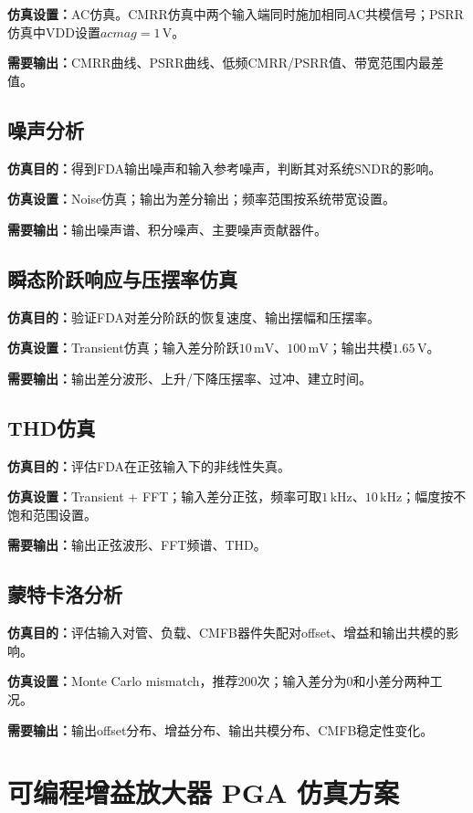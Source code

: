 \documentclass[12pt,a4paper]{ctexart}
\begin{document}
\textbf{仿真设置：}AC仿真。CMRR仿真中两个输入端同时施加相同AC共模信号；PSRR仿真中VDD设置$acmag=1\,\mathrm{V}$。

\textbf{需要输出：}CMRR曲线、PSRR曲线、低频CMRR/PSRR值、带宽范围内最差值。

\subsection{噪声分析}

\textbf{仿真目的：}得到FDA输出噪声和输入参考噪声，判断其对系统SNDR的影响。

\textbf{仿真设置：}Noise仿真；输出为差分输出；频率范围按系统带宽设置。

\textbf{需要输出：}输出噪声谱、积分噪声、主要噪声贡献器件。

\subsection{瞬态阶跃响应与压摆率仿真}

\textbf{仿真目的：}验证FDA对差分阶跃的恢复速度、输出摆幅和压摆率。

\textbf{仿真设置：}Transient仿真；输入差分阶跃$10\,\mathrm{mV}$、$100\,\mathrm{mV}$；输出共模$1.65\,\mathrm{V}$。

\textbf{需要输出：}输出差分波形、上升/下降压摆率、过冲、建立时间。

\subsection{THD仿真}

\textbf{仿真目的：}评估FDA在正弦输入下的非线性失真。

\textbf{仿真设置：}Transient + FFT；输入差分正弦，频率可取$1\,\mathrm{kHz}$、$10\,\mathrm{kHz}$；幅度按不饱和范围设置。

\textbf{需要输出：}输出正弦波形、FFT频谱、THD。

\subsection{蒙特卡洛分析}

\textbf{仿真目的：}评估输入对管、负载、CMFB器件失配对offset、增益和输出共模的影响。

\textbf{仿真设置：}Monte Carlo mismatch，推荐200次；输入差分为0和小差分两种工况。

\textbf{需要输出：}输出offset分布、增益分布、输出共模分布、CMFB稳定性变化。

\section{可编程增益放大器 PGA 仿真方案}
\end{document}
